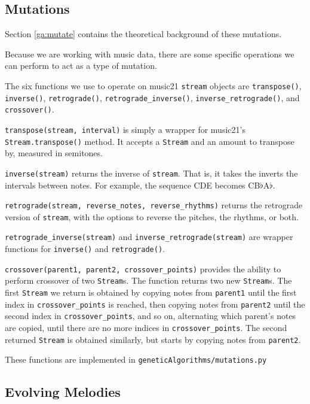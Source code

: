\subsection{Mutations} \label{software:ga:mutations}

Section \ref{ga:mutate} contains the theoretical background of these mutations.

Because we are working with music data, there are some specific operations we can perform to act as a type of mutation.

The six functions we use to operate on music21 \texttt{stream} objects are \texttt{transpose()}, \texttt{inverse()}, \texttt{retrograde()}, \texttt{retrograde\_inverse()}, \texttt{inverse\_retrograde()}, and \texttt{crossover()}.

\texttt{transpose(stream, interval)} is simply a wrapper for music21's \texttt{Stream.transpose()} method.
It accepts a \texttt{Stream} and an amount to transpose by, measured in semitones.

\texttt{inverse(stream)} returns the inverse of \texttt{stream}.
That is, it takes the inverts the intervals between notes.
For example, the sequence CDE becomes CB$\flat$A$\flat$.

\texttt{retrograde(stream, reverse\_notes, reverse\_rhythms)} returns the retrograde version of \texttt{stream}, with the options to reverse the pitches, the rhythms, or both.

\texttt{retrograde\_inverse(stream)} and \texttt{inverse\_retrograde(stream)} are wrapper functions for \texttt{inverse()} and \texttt{retrograde()}.

\texttt{crossover(parent1, parent2, crossover\_points)} provides the ability to perform crossover of two \texttt{Stream}s.
The function returns two new \texttt{Stream}s.
The first \texttt{Stream} we return is obtained by copying notes from \texttt{parent1} until the first index in \texttt{crossover\_points} is reached, then copying notes from \texttt{parent2} until the second index in \texttt{crossover\_points}, and so on, alternating which parent's notes are copied, until there are no more indices in \texttt{crossover\_points}.
The second returned \texttt{Stream} is obtained similarly, but starts by copying notes from \texttt{parent2}.

These functions are implemented in \texttt{geneticAlgorithms/mutations.py}

\subsection{Evolving Melodies} \label{software:ga:evolving}

